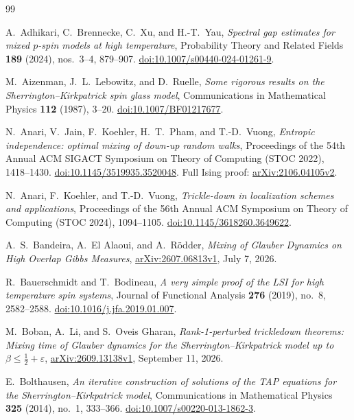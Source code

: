 {}
\begin{thebibliography}{99}

A.~Adhikari, C.~Brennecke, C.~Xu, and H.-T.~Yau,
\emph{Spectral gap estimates for mixed $p$-spin models at high temperature},
Probability Theory and Related Fields \textbf{189} (2024), nos.~3--4,
879--907.
\href{https://doi.org/10.1007/s00440-024-01261-9}{doi:10.1007/s00440-024-01261-9}.

M.~Aizenman, J.~L.~Lebowitz, and D.~Ruelle,
\emph{Some rigorous results on the Sherrington--Kirkpatrick spin glass model},
Communications in Mathematical Physics \textbf{112} (1987), 3--20.
\href{https://doi.org/10.1007/BF01217677}{doi:10.1007/BF01217677}.

N.~Anari, V.~Jain, F.~Koehler, H.~T.~Pham, and T.-D.~Vuong,
\emph{Entropic independence: optimal mixing of down-up random walks},
Proceedings of the 54th Annual ACM SIGACT Symposium on Theory of Computing
(STOC 2022), 1418--1430.
\href{https://doi.org/10.1145/3519935.3520048}{doi:10.1145/3519935.3520048}.
Full Ising proof: \href{https://arxiv.org/abs/2106.04105v2}{arXiv:2106.04105v2}.

N.~Anari, F.~Koehler, and T.-D.~Vuong,
\emph{Trickle-down in localization schemes and applications},
Proceedings of the 56th Annual ACM Symposium on Theory of Computing
(STOC 2024), 1094--1105.
\href{https://doi.org/10.1145/3618260.3649622}{doi:10.1145/3618260.3649622}.

A.~S.~Bandeira, A.~El Alaoui, and A.~R\"odder,
\emph{Mixing of Glauber Dynamics on High Overlap Gibbs Measures},
\href{https://arxiv.org/abs/2607.06813v1}{arXiv:2607.06813v1},
July 7, 2026.

R.~Bauerschmidt and T.~Bodineau,
\emph{A very simple proof of the LSI for high temperature spin systems},
Journal of Functional Analysis \textbf{276} (2019), no.~8, 2582--2588.
\href{https://doi.org/10.1016/j.jfa.2019.01.007}{doi:10.1016/j.jfa.2019.01.007}.

M.~Boban, A.~Li, and S.~Oveis Gharan,
\emph{Rank-1-perturbed trickledown theorems: Mixing time of Glauber dynamics
for the Sherrington--Kirkpatrick model up to $\beta\leq\frac12+\varepsilon$},
\href{https://arxiv.org/abs/2609.13138v1}{arXiv:2609.13138v1},
September 11, 2026.

E.~Bolthausen,
\emph{An iterative construction of solutions of the TAP equations for the
Sherrington--Kirkpatrick model}, Communications in Mathematical Physics
\textbf{325} (2014), no.~1, 333--366.
\href{https://doi.org/10.1007/s00220-013-1862-3}{doi:10.1007/s00220-013-1862-3}.


\end{thebibliography}
